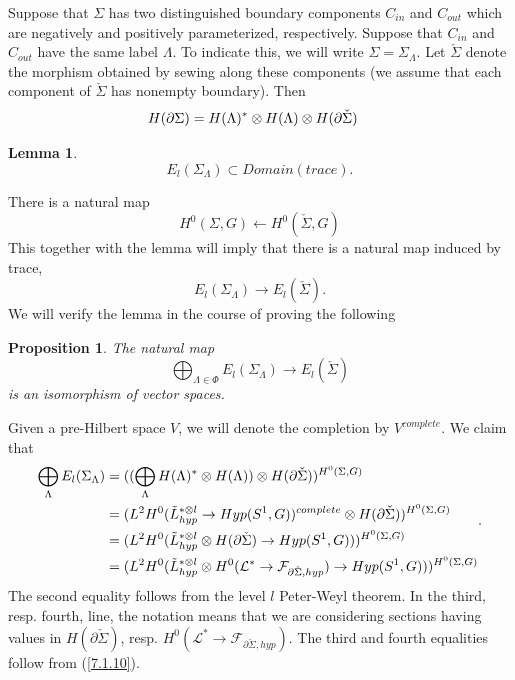 \documentclass{amsart}
\newtheorem{lemma}{Lemma}
\newtheorem{proposition}{Proposition}
\theoremstyle{conjecture}
\theoremstyle{definition}
\theoremstyle{question}
\theoremstyle{questions}
\theoremstyle{remark}
\theoremstyle{remarks}
\theoremstyle{example}
\numberwithin{equation}{section}
\begin{document}
Suppose that $\Sigma$ has two distinguished boundary
components $C_{in}$ and $C_{out}$ which are negatively and
positively parameterized, respectively.  Suppose that $C_{in}$
and $C_{out}$ have the same label $\Lambda$.  To indicate this, we
will write $\Sigma =\Sigma_{\Lambda}$.  Let $\check{\Sigma}$ denote the morphism obtained
by sewing along these components (we assume that each
component of $\check{\Sigma}$ has nonempty boundary).  Then
\begin{equation}\aligned
H(\partial\Sigma )&=H(\Lambda )^{*}\otimes H(\Lambda )\otimes H(\partial
\check{\Sigma })\endaligned
 \label{7.2.1}\end{equation}

\begin{lemma}
$$E_l(\Sigma_{\Lambda})\subset Domain(trace).$$
\end{lemma}

There is a natural map
\begin{equation}H^0(\Sigma ,G)\leftarrow H^0(\check{\Sigma },G) \label{7.2.3}\end{equation}
This together with the lemma will imply that there is a
natural map induced by trace,
\begin{equation}E_l(\Sigma_{\Lambda})\to E_l(\check{\Sigma }). \label{7.2.4}\end{equation}
We will verify the lemma in the course of proving the
following

\begin{proposition}The natural map
$$\bigoplus_{\Lambda\in\Phi}E_l(\Sigma_{\Lambda})\to E_l(\check{\Sigma }
)$$
is an isomorphism of vector
spaces.\end{proposition}

  Given a pre-Hilbert space $V$, we will
denote the completion by $V^{complete}$.  We claim that
\begin{equation}\aligned
\bigoplus_{\Lambda}E_l(\Sigma_{\Lambda})&=((\bigoplus_{\Lambda}H(
\Lambda )^{*}\otimes H(\Lambda ))\otimes H(\partial\check{\Sigma }
))^{H^0(\Sigma ,G)}\\
&=(L^2H^0(\tilde {L}_{hyp}^{*\otimes l}\to Hyp(S^1,G))^{complete}
\otimes H(\partial\check{\Sigma }))^{H^0(\Sigma ,G)}\\
&=(L^2H^0(\tilde {L}_{hyp}^{*\otimes l}\otimes H(\partial\check{
\Sigma })\to Hyp(S^1,G)))^{H^0(\Sigma ,G)}\\
&=(L^2H^0(\tilde {L}_{hyp}^{*\otimes l}\otimes H^0(\mathcal L^{
*}\to \mathcal F_{\partial\check{\Sigma },hyp})\to Hyp(S^1,G)))^{H^0
(\Sigma ,G)}\endaligned
. \label{7.2.6}\end{equation}
The second equality follows from the level $l$ Peter-Weyl
theorem.  In the third, resp.  fourth, line, the notation
means that we are considering sections having values in
$H(\partial\check{\Sigma })$, resp.  $H^0(\mathcal L^{*}\to \mathcal F_{
\partial\check{\Sigma },hyp})$.  The third and fourth
equalities follow from (\ref{7.1.10}).
\end{document}
